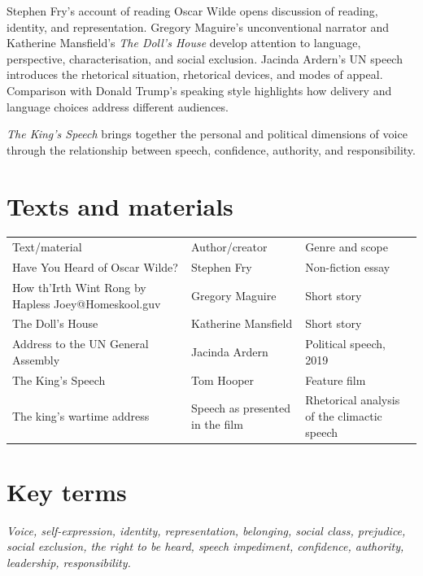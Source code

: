\documentclass[11pt,a4paper,oneside]{book}
\begin{document}
Stephen Fry's account of reading Oscar Wilde opens discussion of reading, identity, and representation. Gregory Maguire's unconventional narrator and Katherine Mansfield's \emph{The Doll's House} develop attention to language, perspective, characterisation, and social exclusion. Jacinda Ardern's UN speech introduces the rhetorical situation, rhetorical devices, and modes of appeal. Comparison with Donald Trump's speaking style highlights how delivery and language choices address different audiences.

\emph{The King's Speech} brings together the personal and political dimensions of voice through the relationship between speech, confidence, authority, and responsibility.


\section*{Texts and materials}

{\small\setlength{\tabcolsep}{4pt}\renewcommand{\arraystretch}{1.15}\begin{tabularx}{\linewidth}{@{}>{\raggedright\arraybackslash}X>{\raggedright\arraybackslash}X>{\raggedright\arraybackslash}X@{}}\toprule
Text/material & Author/creator & Genre and scope\\
Have You Heard of Oscar Wilde? & Stephen Fry & Non-fiction essay\\
How th'Irth Wint Rong by Hapless Joey@Homeskool.guv & Gregory Maguire & Short story\\
The Doll's House & Katherine Mansfield & Short story\\
Address to the UN General Assembly & Jacinda Ardern & Political speech, 2019\\
The King's Speech & Tom Hooper & Feature film\\
The king's wartime address & Speech as presented in the film & Rhetorical analysis of the climactic speech\\
\bottomrule\end{tabularx}}\par\medskip

\section*{Key terms}
\emph{Voice, self-expression, identity, representation, belonging, social class, prejudice, social exclusion, the right to be heard, speech impediment, confidence, authority, leadership, responsibility.}

\par\endgroup\clearpage
\end{document}
